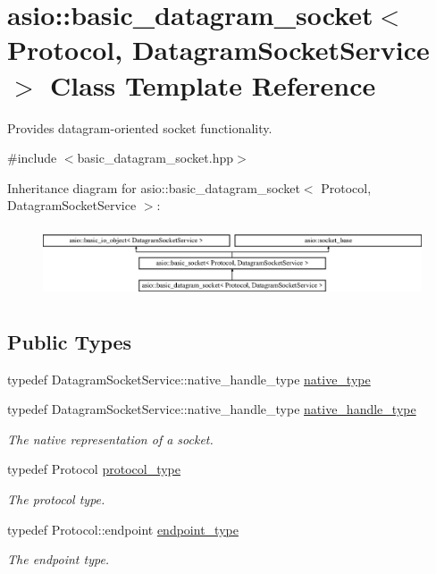 \hypertarget{classasio_1_1basic__datagram__socket}{}\section{asio\+:\+:basic\+\_\+datagram\+\_\+socket$<$ Protocol, Datagram\+Socket\+Service $>$ Class Template Reference}
\label{classasio_1_1basic__datagram__socket}


Provides datagram-\/oriented socket functionality.  




{\ttfamily \#include $<$basic\+\_\+datagram\+\_\+socket.\+hpp$>$}

Inheritance diagram for asio\+:\+:basic\+\_\+datagram\+\_\+socket$<$ Protocol, Datagram\+Socket\+Service $>$\+:\begin{figure}[H]
\begin{center}
\leavevmode
\includegraphics[height=2.115869cm]{classasio_1_1basic__datagram__socket}
\end{center}
\end{figure}
\subsection*{Public Types}
\begin{DoxyCompactItemize}
\item 
typedef Datagram\+Socket\+Service\+::native\+\_\+handle\+\_\+type \hyperlink{classasio_1_1basic__datagram__socket_ac8d4527707418c54b614980272cfa2fb}{native\+\_\+type}
\item 
typedef Datagram\+Socket\+Service\+::native\+\_\+handle\+\_\+type \hyperlink{classasio_1_1basic__datagram__socket_a6e056acde4635471987bd2e39024d39c}{native\+\_\+handle\+\_\+type}
\begin{DoxyCompactList}\small\item\em The native representation of a socket. \end{DoxyCompactList}\item 
typedef Protocol \hyperlink{classasio_1_1basic__datagram__socket_ab65a458559daaa97ef48f6ee8ce46276}{protocol\+\_\+type}
\begin{DoxyCompactList}\small\item\em The protocol type. \end{DoxyCompactList}\item 
typedef Protocol\+::endpoint \hyperlink{classasio_1_1basic__datagram__socket_af952c8d18c85588a16531cfc54a172bb}{endpoint\+\_\+type}
\begin{DoxyCompactList}\small\item\em The endpoint type. \end{DoxyCompactList}\end{DoxyCompactItemize}
